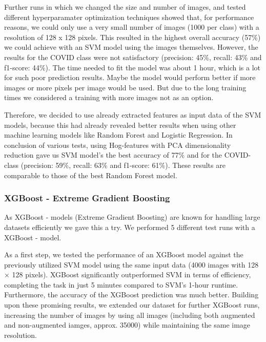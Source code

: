 \documentclass{article}
\begin{document}
Further runs in which we changed the size and number of images, and tested different hyperparamater optimization techniques showed that, for performance reasons, we could only use a very small number of images (1000 per class) with a resolution of 128 x 128 pixels. This resulted in the highest overall accuracy (57\%) we could achieve with an SVM model using the images themselves. However, the results for the COVID class were not satisfactory (precision: 45\%, recall: 43\% and f1-score: 44\%). The time needed to fit the model was about 1 hour, which is a lot for such poor prediction results. Maybe the model would perform better if more images or more pixels per image would be used. But due to the long training times we considered a training with more images not as an option.

Therefore, we decided to use already extracted features as input data of the SVM models, because this had already revealed better results when using other machine learning models like Random Forest and Logistic Regression. In conclusion of various tests, using Hog-features with PCA dimensionality reduction gave us SVM model's the best accuracy of 77\% and for the COVID-class (precision: 59\%, recall: 63\% and f1-score: 61\%). These results are comparable to those of the best Random Forest model.


\subsubsection{XGBoost - Extreme Gradient Boosting}
As XGBoost - models (Extreme Gradient Boosting) are known for handling large datasets efficiently we gave this a try. We performed 5 different test runs with a XGBoost - model. 

As a first step, we tested the performance of an XGBoost model against the previously utilized SVM model using the same input data (4000 images with 128 × 128 pixels). XGBoost significantly outperformed SVM in terms of efficiency, completing the task in just 5 minutes compared to SVM’s 1-hour runtime. Furthermore, the accuracy of the XGBoost prediction was much better. 
Building upon these promising results, we extended our dataset for further XGBoost runs, increasing the number of images by using all images (including both augmented and non-augmented iamges, approx. 35000) while maintaining the same image resolution.
\end{document}
